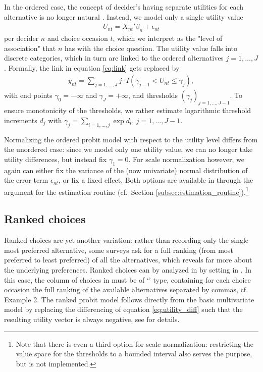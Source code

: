 \documentclass[article,shortnames]{jss}
\newcommand{\class}[1]{`\code{#1}'}
\newcommand{\fct}[1]{\code{#1()}}
\begin{document}
In the ordered case, the concept of decider's having separate utilities for each alternative is no longer natural \citep[Ch.\ 7.4]{Train:2009}. Instead, we model only a single utility value
\begin{align*}
  U_{nt} = X_{nt}'\beta_n + \epsilon_{nt}
\end{align*}
per decider $n$ and choice occasion $t$, which we interpret as the "level of association" that $n$ has with the choice question. The utility value falls into discrete categories, which in turn are linked to the ordered alternatives $j=1,\dots,J$. Formally, the link in equation \eqref{eq:link} gets replaced by
\begin{align*}
   y_{nt} = \sum_{j = 1,\dots,J} j \cdot I(\gamma_{j-1} < U_{nt} \leq \gamma_{j}),
\end{align*}
with end points $\gamma_0 = -\infty$ and $\gamma_J = +\infty$, and thresholds $(\gamma_j)_{j=1,\dots,J-1}$. To ensure monotonicity of the thresholds, we rather estimate logarithmic threshold increments $d_j$ with $\gamma_j = \sum_{i=1,\dots,j} \exp{d_i}$, $j=1,\dots,J-1$.

Normalizing the ordered probit model with respect to the utility level differs from the unordered case: since we model only one utility value, we can no longer take utility differences, but instead fix $\gamma_1 = 0$. For scale normalization however, we again can either fix the variance of the (now univariate) normal distribution of the error term $\epsilon_{nt}$, or fix a fixed effect. Both options are available in  through the  argument for the estimation routine \fct{fit\_model} (cf.\ Section \ref{subsec:estimation_routine}).\footnote{Note that there is even a third option for scale normalization: restricting the value space for the thresholds to a bounded interval also serves the purpose, but is not implemented.}

\subsection{Ranked choices} \label{subsec:ranked_choices}

Ranked choices are yet another variation: rather than recording only the single most preferred alternative, some surveys ask for a full ranking (from most preferred to least preferred) of all the alternatives, which reveals far more about the underlying preferences. Ranked choices can by analyzed in  by setting  in \fct{prepare\_data}. In this case, the column of choices in  must be of \class{character} type, containing for each choice occasion the full ranking of the available alternatives separated by commas, cf. Example 2. The ranked probit model follows directly from the basic multivariate model by replacing the differencing of equation \eqref{eq:utility_diff} such that the resulting utility vector is always negative, see \citep[Ch.\ 7.3]{Train:2009} for details.
\end{document}
